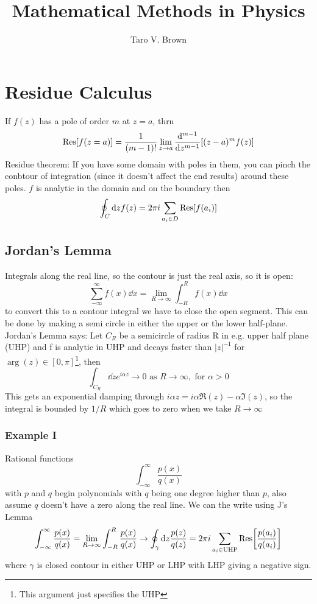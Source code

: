 \documentclass[a4paper,12pt]{article}
\title{Mathematical Methods in Physics}
\author[a]{Taro V. Brown}
\affiliation[a]{Department of Physics, UC Davis, One Shields Avenue, Davis, CA 95616, USA }
\begin{document}
 
\maketitle
\flushbottom
\tableofcontents
\newpage
\section{Residue Calculus}
If $f(z)$ has a pole of order $m$ at $z=a$, thrn
\begin{equation}
\Res[f(z=a)]=\frac{1}{(m-1)!}\lim_{z\to a}\dv[m-1]{}{z}[(z-a)^mf(z)]
\end{equation}
Residue theorem:
If you have some domain with poles in them, you can pinch the conbtour of integration (since it doesn't affect the end results) around these poles. $f$ is analytic in the domain and on the boundary then
\begin{equation}
\oint _C \dd z  f(z)=2\pi i \sum_{a_i\in D}\Res[f(a_i)]\end{equation}
\subsection{Jordan's Lemma} Integrals along the real line, so the contour is just the real axis, so it is open:
\begin{equation}
	\sum_{-\infty}^{\infty}f(x)\dd x= \lim_{R\to \infty }\int_{-R}^{R}f(x)\dd x
\end{equation}
to convert this to a contour integral we have to close the open segment. This can be done by making a semi circle in either the upper or the lower half-plane.
\\
Jordan's Lemma says:
Let $C_R$ be a semicircle of radius R in e.g. upper half plane (UHP) and f is analytic in UHP and decays faster than $|z|^{-1}$ for $\arg(z)\in [0,\pi]$\footnote{This argument just specifies the UHP}, then
\begin{equation}
	\int_{C_R} \dd z e^{i\alpha z}\to 0 \text{ as } R\to \infty, \text{ for } \alpha > 0
\end{equation}
This gets an exponential damping through $i\alpha z=i\alpha \Re (z)-\alpha \Im(z)$, so the integral is bounded by $1/R$ which goes to zero when we take $R\to \infty$\\
\subsubsection{Example I}
Rational functions
\begin{equation}
\int_{-\infty}^{\infty}\frac{p(x)}{q(x)}
\end{equation}
with $p$ and $q$ begin polynomials with $q$ being one degree higher than $p$, also assume $q$ doesn't have a zero along the real line. We can the write using J's Lemma
\begin{equation}
	\int_{-\infty}^{\infty}\frac{p(x)}{q(x)}=\lim_{R\to \infty}\int_{-R}^{R}\frac{p(x)}{q(x)}\to \oint_\gamma \dd z\frac{p(z)}{q(z)}=2\pi i \sum_{a_i\in\text{UHP}}\Res[\frac{p(a_i)}{q(a_i)}]
\end{equation}
where $\gamma$ is closed contour in either UHP or LHP with LHP giving a negative sign.\\
\end{document}
